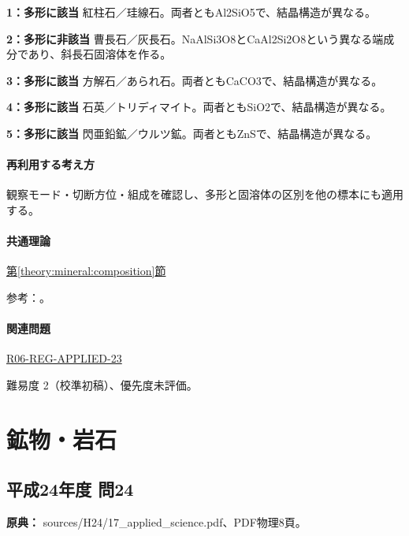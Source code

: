 \noindent\textbf{1：多形に該当} 紅柱石／珪線石。両者ともAl2SiO5で、結晶構造が異なる。\par

\noindent\textbf{2：多形に非該当} 曹長石／灰長石。NaAlSi3O8とCaAl2Si2O8という異なる端成分であり、斜長石固溶体を作る。\par

\noindent\textbf{3：多形に該当} 方解石／あられ石。両者ともCaCO3で、結晶構造が異なる。\par

\noindent\textbf{4：多形に該当} 石英／トリディマイト。両者ともSiO2で、結晶構造が異なる。\par

\noindent\textbf{5：多形に該当} 閃亜鉛鉱／ウルツ鉱。両者ともZnSで、結晶構造が異なる。\par

\paragraph{再利用する考え方} 観察モード・切断方位・組成を確認し、多形と固溶体の区別を他の標本にも適用する。

\paragraph{共通理論} \hyperref[theory:mineral:composition]{第\ref*{theory:mineral:composition}節}

\par 参考：\cite{hom_albite,hom_anorthite,hom_andalusite,hom_calcite,hom_quartz,hom_sphalerite}。

\paragraph{関連問題} \hyperref[q:r06-reg-applied-23]{R06-REG-APPLIED-23}

\par 難易度 2（校準初稿）、優先度未評価。

\section{鉱物・岩石}

\subsection{平成24年度 問24}
\label{q:h24-reg-applied-24}

\noindent\textbf{原典：} sources/H24/17\_applied\_science.pdf、PDF物理8頁。

